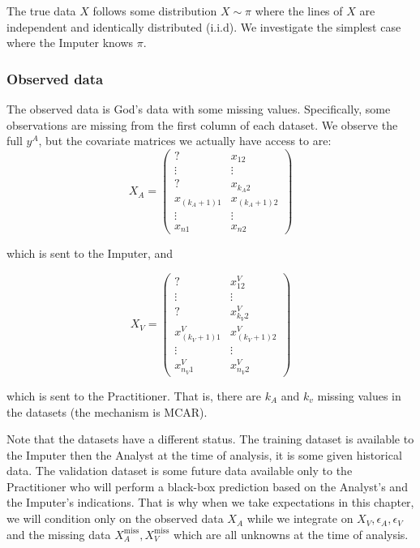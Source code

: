 The true data $X$ follows some distribution $X \sim \pi$ where the lines of $X$ are independent and identically distributed (i.i.d). We investigate the simplest case where the Imputer knows $\pi$.

			\subsubsection{Observed data}
The observed data is God's data with some missing values. Specifically, some observations are missing from the first column of each dataset. We observe the full $y^A$, but the covariate matrices we actually have access to are:
\begin{equation*}
X_A = 
\begin{pmatrix}
? & x_{12} \\
\vdots & \vdots \\
? & x_{k_A2} \\
x_{(k_A+1)1} & x_{(k_A+1)2}\\
\vdots & \vdots \\
x_{n1} & x_{n2}
\end{pmatrix}
\end{equation*}

which is sent to the Imputer, and

\begin{equation*}
X_V = 
\begin{pmatrix}
? & x_{12}^V \\
\vdots & \vdots \\
? & x_{k_V 2}^V \\
x_{(k_V+1)1}^V & x_{(k_V+1)2}^V\\
\vdots & \vdots \\
x_{n_V 1}^V & x_{n_V 2}^V
\end{pmatrix}
\end{equation*}

which is sent to the Practitioner. That is, there are $k_A$ and $k_v$ missing values in the datasets (the mechanism is MCAR).

Note that the datasets have a different status. The training dataset is available to the Imputer then the Analyst at the time of analysis, it is some given historical data. The validation dataset is some future data available only to the Practitioner who will perform a black-box prediction based on the Analyst's and the Imputer's indications. That is why when we take expectations in this chapter, we will condition only on the observed data $X_A$ while we integrate on $X_V, \epsilon_A, \epsilon_V$ and the missing data $X_A^{\text{miss}}, X_V^{\text{miss}}$ which are all unknowns at the time of analysis. 

